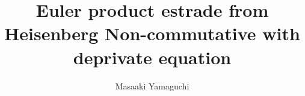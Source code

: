 \documentclass{jsarticle}
\begin{document}
\title{Euler product estrade from \\
Heisenberg Non-commutative with \\
deprivate equation}
\author{Masaaki Yamaguchi}
\date{}

   \newcommand{\variint}{%
	\begin{picture}(15,30)
		\put(0,0){
			$ \iint $}
		\put(0,5){\line(15,0){15}}
	\end{picture} %
}
   \newcommand{\vare}{%
	\begin{picture}(5,5)
		\put(4,4){
			 \line(1,1){5} }
		\put(0,0){$\vee$}
	\end{picture} %
}
   \newcommand{\varve}{%
	\begin{picture}(5,5)
		\put(0,0){$\vee$}
		\put(0,5){\line(5,0){5}}
	\end{picture} %
}
\newcommand{\variiint}{%
	\begin{picture}(15,15)
		\put(0,0){
			$ \iiint $}
		\put(0,5){\line(15,0){20}}
	\end{picture} %
}



 \newcommand{\alearletter}{%
	 \begin{picture}(10,10)
		 \put(0,0){
			 $ \square $}
		 \put(0,0){\line(1,1){10}}
	 \end{picture} %
	 }

 \newcommand{\secproduct}{%
	 \begin{picture}(10,20)
		 \put(0,0){
			 $ \nabla $}
		 \put(5,0){+}
	 \end{picture} %
	 }
 \newcommand{\talot}{%
	 \begin{picture}(15,20)
		 \put(0,0){
			 $ \text{\scalebox{2.0}[2]{$\nabla$}}$}
		 \put(5,3){
			 $ \Delta $}
	 \end{picture} %
	 }
 \newcommand{\hazerdnabla}{%
	 \begin{picture}(15,20)
		 \put(0,0){
			 $ \text{\scalebox{2.0}[2]{$\nabla$}}$}
		 \put(5,3){
			 $\text{Y}  $}
	 \end{picture} %
	 }

 \newcommand{\securebox}{%
	 \begin{picture}(15,20)
		 \put(0,0){
			 $ \text{\scalebox{2.0}[2]{$\square$}}$}
		 \put(5,3){
			 $\text{Y}  $}
	 \end{picture} %
	 }


\newcommand{\timebow}{%
	\begin{picture}(5,5)
		\put(0,0){$\text{\rotatebox{90}{$\bowtie$}}$}
	\end{picture} %
	}
\end{document}
